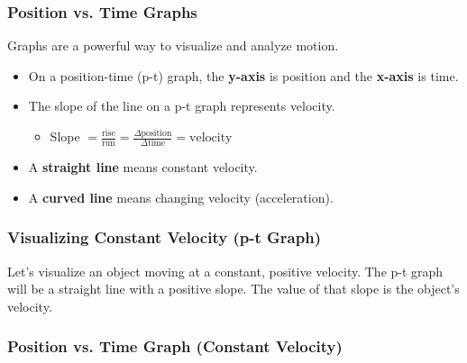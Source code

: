 \documentclass{beamer}
\begin{document}
\begin{frame}
\frametitle{Position vs. Time Graphs}
Graphs are a powerful way to visualize and analyze motion.
\pause
\begin{itemize}
    \item On a position-time (p-t) graph, the \textbf{y-axis} is position and the \textbf{x-axis} is time.
    \pause
    \item The \alert{slope} of the line on a p-t graph represents \alert{velocity}.
    \pause
    \begin{itemize}
        \item Slope $= \frac{\text{rise}}{\text{run}} = \frac{\Delta \text{position}}{\Delta \text{time}} = \text{velocity}$
    \end{itemize}
    \pause
    \item A \textbf{straight line} means constant velocity.
    \pause
    \item A \textbf{curved line} means changing velocity (acceleration).
\end{itemize}
\end{frame}

\begin{frame}
\frametitle{Visualizing Constant Velocity (p-t Graph)}
Let's visualize an object moving at a constant, positive velocity. The p-t graph will be a straight line with a positive slope. The value of that slope is the object's velocity.
\end{frame}

\begin{frame}
\frametitle{Position vs. Time Graph (Constant Velocity)}
\begin{figure}
\end{figure}
\end{frame}
\end{document}
